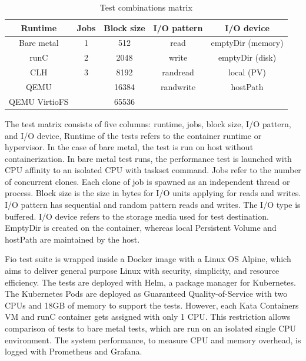 \begin{table}[ht]
\centering
\caption{Test combinations matrix}
\vspace{\baselineskip}
\begin{tabular}{| c | c | c | c | c |}
\hline
\textbf{Runtime} & \textbf{Jobs} & \textbf{Block size} & \textbf{I/O pattern} & \textbf{I/O device} \\ 
\hline
Bare metal & 1 & 512 & read & emptyDir (memory) \\
\hline
runC & 2 & 2048 & write & emptyDir (disk) \\ 
\hline
CLH & 3 & 8192 & randread & local (PV) \\
\hline
QEMU & & 16384 & randwrite & hostPath \\
\hline
QEMU VirtioFS & & 65536 & & \\
\hline
\end{tabular}
\label{table:TestMatrix}
\end{table}

The test matrix consists of five columns: runtime, jobs, block size, I/O pattern, and I/O device, Runtime of the tests refers to the container runtime or hypervisor. In the case of bare metal, the test is run on host without containerization. In bare metal test runs, the performance test is launched with CPU affinity to an isolated CPU with taskset\cite{taskset} command. Jobs refer to the number of concurrent clones. Each clone of job is spawned as an independent thread or process. Block size is the size in bytes for I/O units applying for reads and writes. I/O pattern has sequential and random pattern reads and writes. The I/O type is buffered. I/O device refers to the storage media used for test destination. EmptyDir is created on the container, whereas local Persistent Volume and hostPath are maintained by the host.

Fio test suite is wrapped inside a Docker image with a Linux OS Alpine\cite{Alpine}, which aims to deliver general purpose Linux with security, simplicity, and resource efficiency. The tests are deployed with Helm\cite{Helm}, a package manager for Kubernetes. The Kubernetes Pods are deployed as Guaranteed Quality-of-Service with two CPUs and 18GB of memory to support the tests. However, each Kata Containers VM and runC container gets assigned with only 1 CPU. This restriction allows comparison of tests to bare metal tests, which are run on an isolated single CPU environment. The system performance, to measure CPU and memory overhead, is logged with Prometheus and Grafana.

